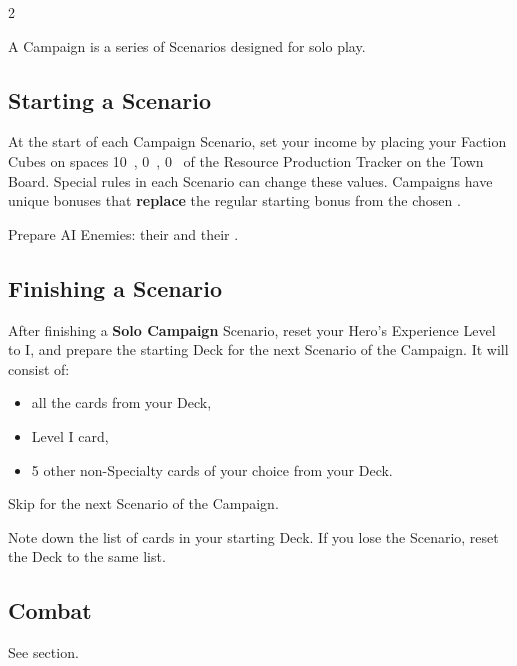 
\begin{multicols*}{2}

A Campaign is a series of Scenarios designed for solo play.

\subsection*{Starting a Scenario}
At the start of each Campaign Scenario, set your income by placing your Faction Cubes on spaces 10~, 0~, 0~ of the Resource Production Tracker on the Town Board. Special rules in each Scenario can change these values.
Campaigns have unique bonuses that \textbf{replace} the regular starting bonus from the chosen .

Prepare AI Enemies: their  and their .

\subsection*{Finishing a Scenario}
After finishing a \textbf{Solo Campaign} Scenario, reset your Hero's Experience Level to I, and prepare the starting Deck for the next Scenario of the Campaign.
It will consist of:
\begin{itemize}
  \item all the  cards from your Deck,
  \item Level I  card,
  \item 5 other non-Specialty cards of your choice from your Deck.
\end{itemize}
Skip  for the next Scenario of the Campaign.

Note down the list of cards in your starting Deck.
If you lose the Scenario, reset the Deck to the same list.

\bigskip
{}

\subsection*{Combat}
See  section.


\end{multicols*}
